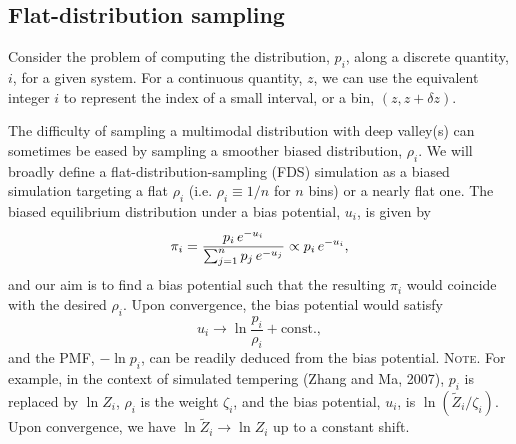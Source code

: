 \documentclass[preprint, superscriptaddress, floatfix]{revtex4-1}
\newcommand{\note}[1]{{\color{DarkGreen}\footnotesize \textsc{Note.} #1}}
\begin{document}
\subsection{\label{sec:background}
Flat-distribution sampling}






Consider the problem of computing
the distribution, $p_i$,
along a discrete quantity, $i$,
for a given system.
%
%
For a continuous quantity, $z$,
we can use the equivalent integer $i$ to represent
the index of a small interval, or a bin,
$(z, z + \delta z)$.
%



The difficulty of sampling a multimodal distribution
with deep valley(s) can sometimes be eased by
sampling a smoother biased distribution, $\rho_i$.
%
%
We will broadly define
a flat-distribution-sampling (FDS) simulation
as a biased simulation
targeting a flat $\rho_i$ (i.e. $\rho_i \equiv 1/n$ for $n$ bins)
or a nearly flat one\cite{
dayal2004, *trebst2004, barducci2008, singh2011}.
%
The biased equilibrium distribution
under a bias potential, $u_i$, is given by
%
\begin{equation}
  \pi_i
  =
  \frac{                p_i \, e^{-u_i} }
       { \sum_{j = 1}^n p_j \, e^{-u_j} }
  \propto
  p_i \, e^{-u_i}
  ,
  \notag
\end{equation}
%
and our aim is to find a bias potential
such that the resulting $\pi_i$ would coincide
with the desired $\rho_i$.
%
Upon convergence, the bias potential would satisfy
%
\begin{equation}
  u_i \to \ln \frac{p_i}{\rho_i} + \mathrm{const.}
  ,
  \label{eq:Vi_target}
\end{equation}
%
%
and the PMF, $-\ln p_i$, can be readily
deduced from the bias potential. %
\note{
  For example, in the context of simulated tempering (Zhang and Ma, 2007),
  $p_i$ is replaced by $\ln Z_i$,
  $\rho_i$ is the weight $\zeta_i$,
  and the bias potential, $u_i$, is $\ln (\tilde Z_i / \zeta_i)$.
  Upon convergence, we have $\ln \tilde Z_i \to \ln Z_i$
  up to a constant shift.
}
\end{document}
